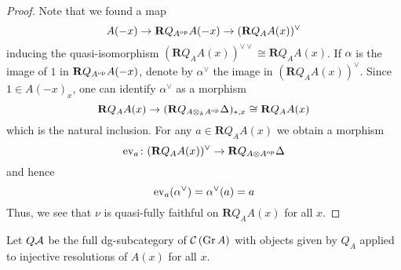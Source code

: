 \begin{proof}


  Note that we found a map
  \begin{displaymath}
    A(-x) \to \mathbf{R}Q_{A^{\operatorname{op}}} A(-x) \to ( \mathbf{R}Q_A A(x) )^\vee 
  \end{displaymath}
  inducing the quasi-isomorphism \((\mathbf{R}Q_A A(x))^{\vee \vee} \cong \mathbf{R}Q_A A(x)\).
  If \(\alpha\) is the image of \(1\) in \(\mathbf{R}Q_{A^{\operatorname{op}}} A(-x)\), denote by \(\alpha^\vee\) the image in \((\mathbf{R}Q_A A(x))^\vee\).
  Since \(1 \in A(-x)_x\), one can identify \(\alpha^\vee\) as a morphism
  \[\mathbf{R}Q_A A(x) \to (\mathbf{R}Q_{A \otimes_k A^{\operatorname{op}}} \Delta)_{\ast,x} \cong \mathbf{R}Q_A A(x)\]
  which is the natural inclusion.
  For any \(a \in \mathbf{R}Q_A A(x)\) we obtain a morphism
  \[\operatorname{ev}_a \colon (\mathbf{R}Q_A A(x))^\vee \to \mathbf{R}Q_{A \otimes A^{\operatorname{op}}} \Delta \]
  and hence
  \[\operatorname{ev}_a(\alpha^\vee) = \alpha^\vee(a) = a\]
  Thus, we see that \(\nu\) is quasi-fully faithful on \(\mathbf{R}Q_A A(x)\) for all \(x\). 
\end{proof}

\begin{definition}
  Let \(Q\mathcal{A}\) be the full dg-subcategory of \(\mathcal{C}\left(\operatorname{Gr}A\right)\) with objects given by \(Q_A\) applied to injective resolutions of \(A(x)\) for all \(x\). 
\end{definition}

